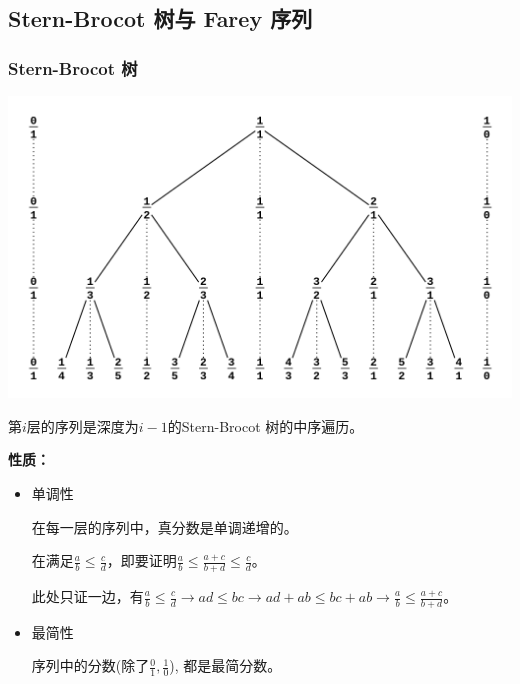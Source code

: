 \subsection{Stern-Brocot 树与 Farey 序列}

\subsubsection{Stern-Brocot 树}

\begin{center}
\includegraphics[scale=0.45]{images/stern-brocot1.png} %
\end{center}

第$i$层的序列是深度为$i - 1$的Stern-Brocot 树的中序遍历。\par

\textbf{性质：}

\begin{itemize}
\item 单调性\par
在每一层的序列中，真分数是单调递增的。\par
在满足$\displaystyle \frac{a}{b} \leq \frac{c}{d}$，即要证明$\displaystyle \frac{a}{b} \leq \frac{a + c}{b + d} \leq \frac{c}{d}$。\par

此处只证一边，有$\displaystyle \frac{a}{b} \leq \frac{c}{d} \to ad \leq bc \to ad + ab \leq bc + ab \to \frac{a}{b} \leq \frac{a + c}{b + d}$。\par


\item 最简性\par
序列中的分数(除了$\frac{0}{1}, \frac{1}{0}$), 都是最简分数。\par


\end{itemize}


